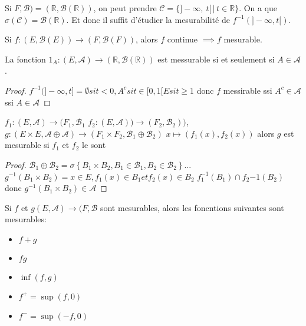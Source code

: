 \begin{example}[Application]
	Si $F, \mathscr{B}) = (\mathbb{R}, \mathscr{B}(\mathbb{R}))$, on peut prendre $\mathscr{C} = \{ ]-\infty,\   t[ \, | \, t \in \mathbb{R} \}$. On a que
				$\sigma(\mathscr{C}) = \mathscr{B}(\mathbb{R})$. Et donc il suffit d'étudier la mesurabilité de $f^{-1}(]-\infty, t[)$.
\end{example}


\begin{remarque}
	Si $f : (E,\mathscr{B}(E)) \rightarrow (F,\mathscr{B}(F))$, alors $f$ continue $\implies f$ mesurable.
\end{remarque}


\begin{prop}
	La fonction $\mathscr{1}_A : (E,\mathscr{A}) \rightarrow (\mathbb{R},\mathscr{B}(\mathbb{R}))$ est messurable si et seulement si $A \in \mathscr{A}$.
\end{prop}

\begin{proof}
	$f^{-1}(]-\infty, t] = \emptyset si t < 0, A^c si t \in [0,1[ E si t \geq 1$
	donc $f$ messirable ssi $A^c\in \mathscr{A}$ ssi $A\in \mathscr{A}$
\end{proof}

\begin{prop}
	$f_1 : (E,\mathscr{A}) \rightarrow (F_1,\mathscr{B_1}$
	$f_2 : (E,\mathscr{A})) \rightarrow (F_2,\mathscr{B_2}))$,
	$g: (E \times E,\mathscr{A} \oplus \mathscr{A}) \rightarrow (F_1 \times F_2,\mathscr{B_1} \oplus \mathscr{B_2})$
	$x\mapsto (f_1(x), f_2(x))$
	alors $g$ est mesurable si $f_1$ et $f_2$ le sont
\end{prop}

\begin{proof}
	$\mathscr{B_1} \oplus \mathscr{B_2} = \sigma \left\{ B_1 \times B_2, B_1 \in \mathscr{B_1}, B_2 \in \mathscr{B_2} \right\}...$
	$g^{-1}(B_1 \times B_2) = {x \in E, f_1(x) \in B_1 et f_2(x) \in B_2  }$
	$f_1^{-1}(B_1) \cap f_2{-1}(B_2)$
	donc $g^{-1}(B_1 \times B_2) \in \mathscr{A}$
\end{proof}



\begin{prop}
	Si $f$ et $g (E,\mathscr{A}) \rightarrow (F,\mathscr{B}$
	sont mesurables, alors les foncntions suivantes sont mesurables:
	\begin{itemize}
		\item $f + g$
		\item $fg$
		\item $\inf(f,g)$
		\item $f^+ = \sup(f,0)$
		\item $f^- = \sup(-f,0)$
	\end{itemize}
\end{prop}

